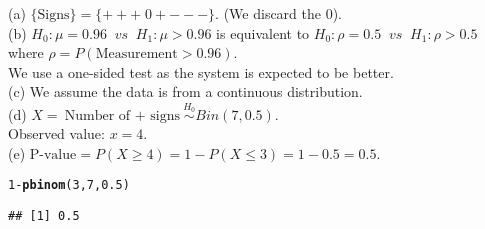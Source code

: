 \documentclass[bigtut]{tutorial}\usepackage[]{graphicx}\usepackage[]{color}
\makeatletter
\newcommand{\hlnum}[1]{\textcolor[rgb]{0.686,0.059,0.569}{#1}}%
\newcommand{\hlopt}[1]{\textcolor[rgb]{0,0,0}{#1}}%
\newcommand{\hlstd}[1]{\textcolor[rgb]{0.345,0.345,0.345}{#1}}%
\newcommand{\hlkwd}[1]{\textcolor[rgb]{0.737,0.353,0.396}{\textbf{#1}}}%
\newenvironment{kframe}{%
 \def\at@end@of@kframe{}%
 \ifinner\ifhmode%
  \def\at@end@of@kframe{\end{minipage}}%
  \begin{minipage}{\columnwidth}%
 \fi\fi%
 \def\FrameCommand##1{\hskip\@totalleftmargin \hskip-\fboxsep
 \colorbox{shadecolor}{##1}\hskip-\fboxsep
     \hskip-\linewidth \hskip-\@totalleftmargin \hskip\columnwidth}%
 \MakeFramed {\advance\hsize-\width
   \@totalleftmargin\z@ \linewidth\hsize
   \@setminipage}}%
 {\par\unskip\endMakeFramed%
 \at@end@of@kframe}
\newenvironment{knitrout}{}{} %
\makeatother
\begin{document}
\begin{tutorial}
\begin{questions}


\begin{solution}
(a)
$\{ \text{Signs} \} = \{ + + +  \; 0 + - - - \}$. 
(We discard the 0).  \\

(b)
$H_0: \mu=0.96  \;\; vs \;\; H_1: \mu>0.96$
is equivalent to  
$H_0: \rho=0.5  \;\; vs \;\; H_1: \rho>0.5$ \\
where $\rho = P(\mbox{Measurement} > 0.96)$.\\
We use a one-sided test as the system is expected to be better. \\

(c)
 We assume the data is from a continuous distribution. \\

(d)
$X = \text{Number of $+$ signs} \overset{H_0}{\sim} Bin(7,0.5)$.\\
Observed value: $x=4$. \\

(e)
$\text{P-value} = P(X \geq 4) = 1- P(X \leq 3) 
= 1- 0.5 = 0.5$. 

\begin{knitrout}
\color{fgcolor}\begin{kframe}
\begin{alltt}
\hlnum{1}\hlopt{-}\hlkwd{pbinom}\hlstd{(}\hlnum{3}\hlstd{,}\hlnum{7}\hlstd{,}\hlnum{0.5}\hlstd{)}
\end{alltt}
\begin{verbatim}
## [1] 0.5
\end{verbatim}
\end{kframe}
\end{knitrout}


\end{solution}
\end{questions}
\end{tutorial}
\end{document}
